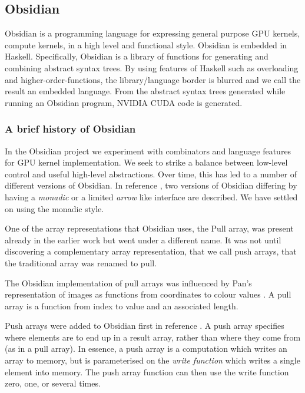 \subsection{Obsidian} 
\label{sec:Obsidian} 

Obsidian is a programming language for expressing general purpose 
GPU kernels, compute kernels, in a high level and functional style.  
Obsidian is embedded in Haskell.
Specifically, Obsidian is a library of functions for generating 
and combining abstract syntax trees.
By using features of Haskell such as overloading and higher-order-functions, 
the library/language border is blurred and we call the result an embedded 
language. From the abstract syntax trees generated while running an 
Obsidian program, NVIDIA CUDA code is generated. 


\subsubsection{A brief history of Obsidian} 
\label{sec:OBSHist}

In the Obsidian project we experiment with combinators and language 
features for GPU kernel implementation. We seek to strike a balance 
between low-level control and useful high-level abstractions. Over time, this 
has led to a number of different versions of Obsidian. In reference , 
two versions of Obsidian differing by having a {\em monadic} or a limited {\em arrow} 
like interface are described. We have settled on using the monadic style. 

One of the array representations that Obsidian uses, the Pull array, was present already 
in the earlier work but went under a different name. It was not until discovering 
a complementary array representation, that we call push arrays, that the traditional 
array was renamed to pull. 

The Obsidian implementation of pull arrays was influenced by Pan's representation 
of images as functions from coordinates to colour values . A pull array 
is a function from index to value and an associated length.  

Push arrays were added to Obsidian first in reference . A push array
specifies where elements are to end up in a result array, rather than where 
they come from (as in a pull array). In essence, a push array is a
computation which writes an array to memory, but is parameterised on
the {\em write function} which writes a single element into memory.
The push array function can then 
use the write function zero, one, or several times. 

